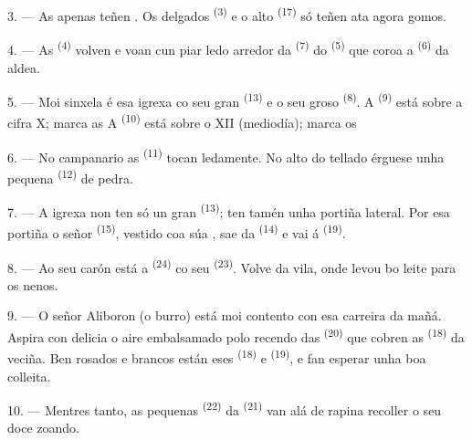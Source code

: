 3. --- As  apenas teñen . Os  delgados
\textsuperscript{(3)} e o  alto \textsuperscript{(17)} só teñen ata agora
gomos.

4. --- As  \textsuperscript{(4)} volven e voan cun piar ledo arredor da
 \textsuperscript{(7)} do  \textsuperscript{(5)} que coroa a
 \textsuperscript{(6)} da aldea.

\VUsaut{3.4mm}
\VUsaut{3.0mm}

5. --- Moi sinxela é esa igrexa co seu gran  \textsuperscript{(13)} e o seu
groso  \textsuperscript{(8)}. A  \textsuperscript{(9)}
está sobre a cifra X; marca as  A
 \textsuperscript{(10)} está sobre o XII (mediodía); marca os

6. --- No campanario as  \textsuperscript{(11)} tocan ledamente. No alto do
tellado érguese unha pequena  \textsuperscript{(12)} de pedra.

7. --- A igrexa non ten só un gran  \textsuperscript{(13)}; ten tamén unha
portiña lateral. Por esa portiña o señor  \textsuperscript{(15)}, vestido coa
súa , sae da  \textsuperscript{(14)} e vai á
 \textsuperscript{(19)}.

8. --- Ao seu carón está a  \textsuperscript{(24)} co seu
 \textsuperscript{(23)}. Volve da vila, onde levou bo leite para os
nenos.

\VUsaut{4.0mm}
\VUsaut{3.4mm}

9. --- O señor Aliboron (o burro) está moi contento con esa carreira da mañá. Aspira con
delicia o aire embalsamado polo recendo das  \textsuperscript{(20)} que cobren
as  \textsuperscript{(18)} da  veciña. Ben rosados e
brancos están eses  \textsuperscript{(18)} e 
\textsuperscript{(19)}, e fan esperar unha boa colleita.

10. --- Mentres tanto, as pequenas  \textsuperscript{(22)} da
 \textsuperscript{(21)} van alá de rapina recoller o seu doce
 zoando.

